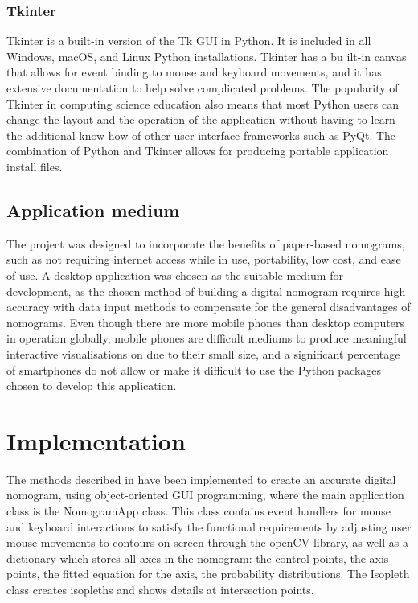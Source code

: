 \documentclass{l4proj}
\begin{document}
\subsection{Tkinter}

Tkinter is a built-in version of the Tk GUI in Python. It is included in all Windows, macOS, and Linux Python installations. Tkinter has a bu
ilt-in canvas that allows for event binding to mouse and keyboard movements, and it has extensive documentation to help solve complicated problems. The popularity of Tkinter in computing science education also means that most Python users can change the layout and the operation of the application without having to learn the additional know-how of other user interface frameworks such as PyQt. The combination of Python and Tkinter allows for producing portable application install files. 

\section{Application medium}

The project was designed to incorporate the benefits of paper-based nomograms, such as not requiring internet access while in use, portability, low cost, and ease of use. 
A desktop application was chosen as the suitable medium for development, as the chosen method of building a digital nomogram requires high accuracy with data input methods to compensate for the general disadvantages of nomograms. Even though there are more mobile phones than desktop computers in operation globally, mobile phones are difficult mediums to produce meaningful interactive visualisations on due to their small size, and a significant percentage of smartphones do not allow or make it difficult to use the Python packages chosen to develop this application.  

\chapter{Implementation}\label{implementation}

The methods described in  have been implemented to create an accurate digital nomogram, using object-oriented GUI programming, where the main application class is the NomogramApp class. This class contains event handlers for mouse and keyboard interactions to satisfy the functional requirements by adjusting user mouse movements to contours on screen through the openCV library, as well as a dictionary which stores all axes in the nomogram: the control points, the axis points, the fitted equation for the axis, the probability distributions. The Isopleth class creates isopleths and shows details at intersection points. 
\end{document}

